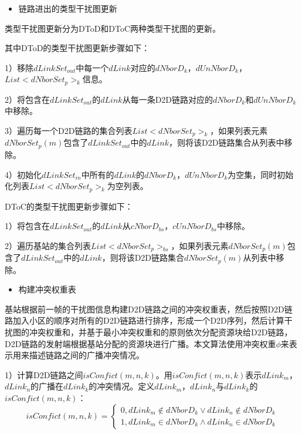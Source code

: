 \documentclass[figurelist,tablelist,algorithmlist,nomlist,masters]{seuthesix}
\begin{document}
	\begin{itemize}
		\item 链路进出的类型干扰图更新
	\end{itemize}
	
	类型干扰图更新分为DToD和DToC两种类型干扰图的更新。
	
	其中DToD的类型干扰图更新步骤如下：
	
	1）移除$dLinkSet_{out}$中每一个$dLink$对应的$dNborD_k$，$dUnNborD_k$，$List < dNborSet_{p}{ > _k}$信息。
	
	2）将包含在$dLinkSet_{out}$的$dLink$从每一条D2D链路对应的$dNborD_k$和$dUnNborD_k$中移除。
	
	3）遍历每一个D2D链路的集合列表$List < dNborSet_{p}{ > _k}$，如果列表元素$dNborSet_{p}(m)$包含了$dLinkSet_{out}$中的$dLink$，则将该D2D链路集合从列表中移除。
	
	4）初始化$dLinkSet_{in}$中所有的$dLink$的$dNborD_k$，$dUnNborD_k$为空集，同时初始化列表$List < dNborSet_{p}{ > _k}$为空列表。
	
	DToC的类型干扰图更新步骤如下：
	
	1）将包含在$dLinkSet_{out}$的$dLink$从$cNborD_{bs}$，$cUnNborD_{bs}$中移除。
	
	2）遍历基站的集合列表$List < dNborSet_{p}{ > _{bs}}$，如果列表元素$dNborSet_{p}(m)$包含了$dLinkSet_{out}$中的$dLink$，则将该D2D链路集合$dNborSet_{p}(m)$从列表中移除。
	
	\begin{itemize}
		\item 构建冲突权重表
	\end{itemize}
	
	基站根据前一帧的干扰图信息构建D2D链路之间的冲突权重表，然后按照D2D链路加入小区的顺序对所有的D2D链路进行排序，形成一个D2D序列，然后计算干扰图的冲突权重和，并基于最小冲突权重和的原则依次分配资源块给D2D链路，D2D链路的发射端根据基站分配的资源块进行广播。本文算法使用冲突权重$\phi $来表示用来描述链路之间的广播冲突情况。
	
	1）计算D2D链路之间$isConfict(m,n,k)$。用$isConfict(m,n,k)$表示$dLink_m$，$dLink_n$的广播在$dLink_k$的冲突情况。定义$dLink_m$，$dLink_n$与$dLink_k$的$isConfict(m,n,k)$：
	\begin{equation}\label{eq2.3}
	isConfict(m,n,k) = \left\{ \begin{array}{l}
	0,dLink_m \notin dNborD_k \lor dLink_n \notin dNborD_k\\
	1,dLink_m \in dNborD_k \land dLink_n \in dNborD_k
	\end{array} \right.
	\end{equation}
	
\end{document}
